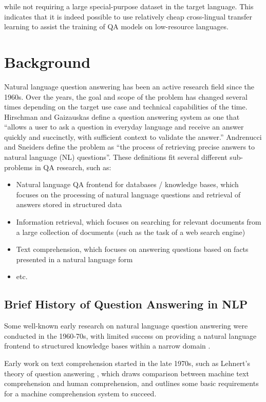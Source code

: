 \documentclass[]{article}
\begin{document}
while not requiring a large special-purpose dataset in the target language. This indicates that it is indeed possible to use relatively cheap cross-lingual transfer learning to assist the training of QA models on low-resource languages.

\section{Background}

Natural language question answering has been an active research field since the 1960s. Over the years, the goal and scope of the problem has changed several times depending on the target use case and technical capabilities of the time. Hirschman and Gaizauskas \cite{hirschman2001natural} define a question answering system as one that “allows a user to ask a question in everyday language and receive an answer quickly and succinctly, with sufficient context to validate the answer.” Andrenucci and Sneiders \cite{andrenucci2005automated} define the problem as “the process of retrieving precise answers to natural language (NL) questions”. These definitions fit several different sub-problems in QA research, such as:
\begin{itemize}
\item 
Natural language QA frontend for databases / knowledge bases, which focuses on the processing of natural language questions and retrieval of answers stored in structured data 
\item
Information retrieval, which focuses on searching for relevant documents from a large collection of documents (such as the task of a web search engine) 
\item
Text comprehension, which focuses on answering questions based on facts presented in a natural language form 
\item
etc.
\end{itemize}

\subsection{Brief History of Question Answering in NLP}
Some well-known early research on natural language question answering were conducted in the 1960-70s, with limited success on providing a natural language frontend to structured knowledge bases within a narrow domain \cite{hirschman2001natural}.

Early work on text comprehension started in the late 1970s, such as Lehnert’s theory of question answering \cite{lehnert1977conceptual}, which draws comparison between machine text comprehension and human comprehension, and outlines some basic requirements for a machine comprehension system to succeed.
\end{document}
